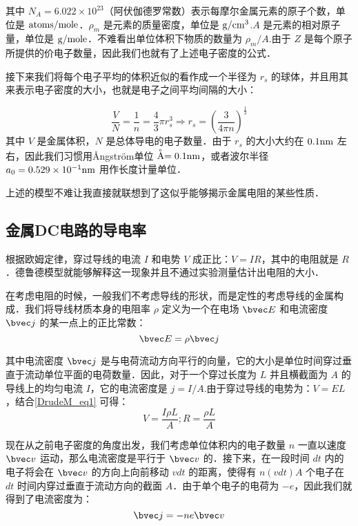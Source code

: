 其中 $N_A=6.022\times 10^{23}$（阿伏伽德罗常数）表示每摩尔金属元素的原子个数，单位是 $\rm{atoms/mole}$．$\rho_m$ 是元素的质量密度，单位是 $\rm{g/cm^3}$.$A$ 是元素的相对原子量，单位是 $\rm{g/mole}$．不难看出单位体积下物质的数量为 $\rho_m/A$.由于 $Z$ 是每个原子所提供的价电子数量，因此我们也就有了上述电子密度的公式．

接下来我们将每个电子平均的体积近似的看作成一个半径为 $r_s$ 的球体，并且用其来表示电子密度的大小，也就是电子之间平均间隔的大小：

\begin{equation}
\frac{V}{N}=\frac{1}{n}=\frac{4}{3}\pi r_s^3 \Rightarrow r_s=\left(\frac{3}{4\pi n}\right)^\frac{1}{3}
\end{equation}
其中 $V$ 是金属体积，$N$ 是总体导电的电子数量．由于 $r_s$ 的大小大约在 $0.1\rm{nm}$ 左右，因此我们习惯用Ångström单位 $\buildrel _{\circ} \over {\mathrm{A}}=0.1\rm{nm}$，或者波尔半径 $a_0=0.529\times 10^{-1}\rm{nm}$ 用作长度计量单位．

上述的模型不难让我直接就联想到了这似乎能够揭示金属电阻的某些性质．

\subsection{金属DC电路的导电率}

根据欧姆定律，穿过导线的电流 $I$ 和电势 $V$ 成正比：$V=IR$，其中的电阻就是 $R$．德鲁德模型就能够解释这一现象并且不通过实验测量估计出电阻的大小．

在考虑电阻的时候，一般我们不考虑导线的形状，而是定性的考虑导线的金属构成．我们将导线材质本身的电阻率 $\rho$ 定义为一个在电场 $\bvec E$ 和电流密度 $\bvec j$ 的某一点上的正比常数：
\begin{equation}\label{DrudeM_eq1}
\bvec E =\rho \bvec j
\end{equation}

其中电流密度 $\bvec j$ 是与电荷流动方向平行的向量，它的大小是单位时间穿过垂直于流动单位平面的电荷数量．因此，对于一个穿过长度为 $L$ 并且横截面为 $A$ 的导线上的均匀电流 $I$，它的电流密度是 $j=I/A$.由于穿过导线的电势为：$V=EL$，结合\autoref{DrudeM_eq1} 可得：
\begin{equation}
V=\frac{I\rho L}{A}; R = \frac{\rho L}{A}
\end{equation}

现在从之前电子密度的角度出发，我们考虑单位体积内的电子数量 $n$ 一直以速度 $\bvec v$ 运动，那么电流密度是平行于 $\bvec v$ 的．接下来，在一段时间 $dt$ 内的电子将会在 $\bvec v$ 的方向上向前移动 $v dt$ 的距离，使得有 $n(v dt)A$ 个电子在 $dt$ 时间内穿过垂直于流动方向的截面 $A$．由于单个电子的电荷为 $-e$，因此我们就得到了电流密度为：
\begin{equation}\label{DrudeM_eq2}
\bvec j = -ne\bvec v
\end{equation}

